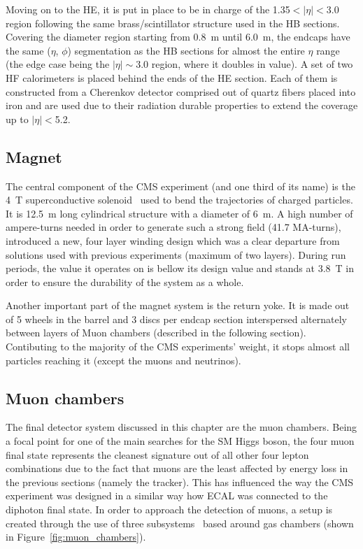 \hspace{10pt} Moving on to the HE, it is put in place to be in charge of the 1.35$<|\eta|<$3.0 region following the same brass/scintillator structure used in the HB sections. Covering the diameter region starting from 0.8~m until 6.0~m, the endcaps have the same ($\eta$, $\phi$) segmentation as the HB sections for almost the entire $\eta$ range (the edge case being the $|\eta|\sim$3.0 region, where it doubles in value). A set of two HF calorimeters is placed behind the ends of the HE section. Each of them is constructed from a Cherenkov detector comprised out of quartz fibers placed into iron and are used due to their radiation durable properties to extend the coverage up to $|\eta|<$5.2.


\subsection{Magnet}
\hspace{10pt} The central component of the CMS experiment (and one third of its name) is the 4~T superconductive solenoid~\cite{cms:paper} used to bend the trajectories of charged particles. It is 12.5~m long cylindrical structure with a diameter of 6~m. A high number of ampere-turns needed in order to generate such a strong field (41.7 MA-turns), introduced a new, four layer winding design which was a clear departure from solutions used with previous experiments (maximum of two layers). During run periods, the value it operates on is bellow its design value and stands at 3.8~T in order to ensure the durability of the system as a whole.

\hspace{10pt} Another important part of the magnet system is the return yoke. It is made out of 5 wheels in the barrel and 3 discs per endcap section interspersed alternately between layers of Muon chambers (described in the following section). Contibuting to the majority of the CMS experiments' weight, it stops almost all particles reaching it (except the muons and neutrinos).
\subsection{Muon chambers}
\label{subsec:cmsmuon}
\hspace{10pt} The final detector system discussed in this chapter are the muon chambers. Being a focal point for one of the main searches for the SM Higgs boson, the four muon final state represents the cleanest signature out of all other four lepton combinations due to the fact that muons are the least affected by energy loss in the previous sections (namely the tracker). This has influenced the way the CMS experiment was designed in a similar way how ECAL was connected to the diphoton final state. In order to approach the detection of muons, a setup is created through the use of three subsystems~\cite{cms:paper,muon_chambers_proceedings} based around gas chambers (shown in Figure~\ref{fig:muon_chambers}). 

